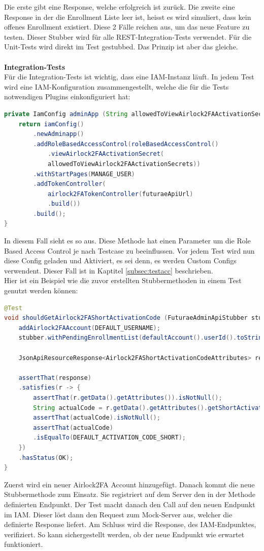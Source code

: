 Die erste gibt eine Response, welche erfolgreich ist zurück. Die zweite eine Response in der die Enrollment Liste leer ist, heisst es wird simuliert, dass kein offenes Enrollment existiert. Diese 2 Fälle reichen aus, um das neue Feature zu testen.
Dieser Stubber wird für alle REST-Integration-Tests verwendet. Für die Unit-Tests wird direkt im Test gestubbed. Das Prinzip ist aber das gleiche.\\\\
\textbf{Integration-Tests}\label{header:inttest}\\
Für die Integration-Tests ist wichtig, dass eine IAM-Instanz läuft. In jedem Test wird eine IAM-Konfiguration zusammengestellt, welche die für die Tests notwendigen Plugins einkonfiguriert hat:
\begin{lstlisting}[language=Java]
private IamConfig adminApp (String allowedToViewAirlock2FAActivationSecrets) {
	return iamConfig()
		.newAdminapp()
		.addRoleBasedAccessControl(roleBasedAccessControl()
			.viewAirlock2FAActivationSecret(
			allowedToViewAirlock2FAActivationSecrets))
		.withStartPages(MANAGE_USER)
		.addTokenController(
			airlock2FATokenController(futuraeApiUrl)
			.build())
		.build();
}
\end{lstlisting}
In diesem Fall sieht es so aus.  Diese Methode hat einen Parameter um die Role Based Access Control je nach Testcase zu beeinflussen.
Vor jedem Test wird nun diese Config geladen und Aktiviert, es sei denn, es werden Custom Configs verwendent. Dieser Fall ist in Kaptitel \ref{subsec:testacc} beschrieben.\\
Hier ist ein Beispiel wie die zuvor erstellten Stubbermethoden in einem Test genutzt werden können:
\begin{lstlisting}[language=Java]
@Test
void shouldGetAirlock2FAShortActivationCode (FuturaeAdminApiStubber stubber) {
	addAirlock2FAAccount(DEFAULT_USERNAME);
	stubber.withPendingEnrollmentList(defaultAccount().userId().toString(), 1);
	
	JsonApiResourceResponse<Airlock2FAShortActivationCodeAttributes> response = getAirlock2FAShortActivationCode(DEFAULT_USERNAME);
	
	assertThat(response)
	.satisfies(r -> {
		assertThat(r.getData().getAttributes()).isNotNull();
		String actualCode = r.getData().getAttributes().getShortActivationCode();
		assertThat(actualCode).isNotNull();
		assertThat(actualCode)
		.isEqualTo(DEFAULT_ACTIVATION_CODE_SHORT);
	})
	.hasStatus(OK);
}
\end{lstlisting}
Zuerst wird ein neuer Airlock2FA Account hinzugefügt. Danach kommt die neue Stubbermethode zum Einsatz. Sie registriert auf dem Server den in der Methode definierten Endpunkt. Der Test macht danach den Call auf den neuen Endpunkt im IAM. Dieser löst dann den Request zum Mock-Server aus, welcher die definierte Response liefert. Am Schluss wird die Response, des IAM-Endpunktes, verifiziert. So kann sichergestellt werden, ob der neue Endpunkt wie erwartet funktioniert.\\
